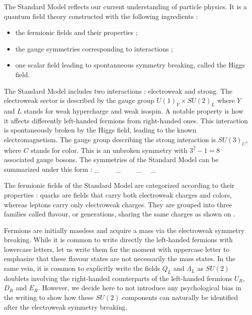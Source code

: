     The Standard Model reflects our current understanding of particle physics. It is
    a quantum field theory constructed with the following ingredients :
    \begin{itemize}
        \item the fermionic fields and their properties ;
        \item the gauge symmetries corresponding to interactions ;
        \item one scalar field leading to spontanneous symmetry breaking, called the
              Higgs field.
    \end{itemize}

    The Standard Model includes two interactions : electroweak and strong. The electroweak
    sector is described by the gauge group $U(1)_Y \times SU(2)_L$ where $Y$ and $L$
    stands for weak hypercharge and weak isospin. A notable property is how it affects
    differently left-handed fermions from right-handed ones. This interaction is
    spontaneously broken by the Higgs field, leading to the known electromagnetism.
    The gauge group describing the strong interaction is $SU(3)_C$, where $C$ stands for
    color. This is an unbroken symmetry with $3^2-1 = 8$ associated gauge bosons. The
    symmetries of the Standard Model can be summarized under this form :
    {
        _{}
        \,\,\,\,
        \times
        \,\,\,\,
        _{}
        \,\,\,\,
        \,\,\,\,
        _{}
        \,\,\,\,
        \times
        _{}
    }

    The fermionic fields of the Standard Model are categorized according to their
    properties : quarks are fields that carry both electroweak charges and colors, whereas
    leptons carry only electroweak charges. They are grouped into three families called
    flavour, or generations, sharing the same charges as shown on .

    Fermions are initially massless and acquire a mass via
    the electroweak symmetry breaking. While it is common to write directly the left-handed
    fermions with lowercase letters, let us write them for the moment with uppercase letter
    to emphasize that these flavour states are not necessarily the mass states. In the same
    vein, it is common to explicitly write the fields $Q_L$ and $\Lambda_L$ as $SU(2)$ doublets
    involving the right-handed counterparts of the left-handed fermions $U_R$, $D_R$ and $E_R$.
    However, we decide here to not introduce any psychological bias in the writing to show
    how these $SU(2)$ components can naturally be identified after the electroweak symmetry breaking.

